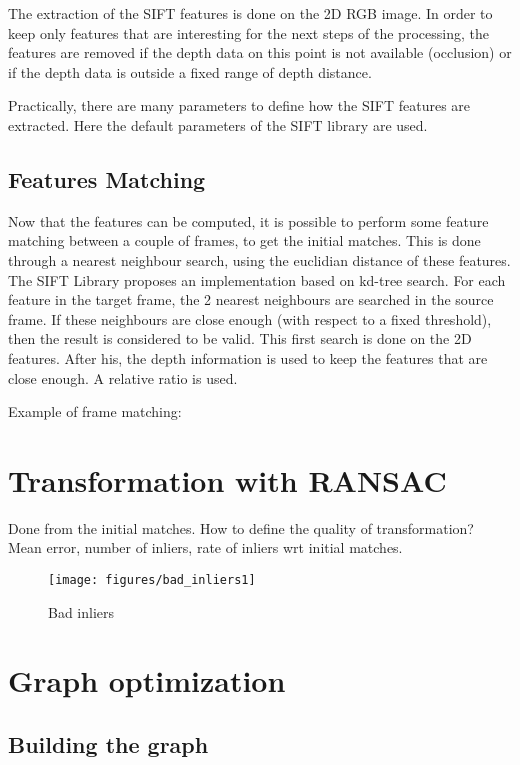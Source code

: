\documentclass[a4paper,11pt]{kth-mag}
\begin{document}
The extraction of the SIFT features is done on the 2D RGB image. In order to keep only features that are interesting for the next steps of the processing, the features are removed if the depth data on this point is not available (occlusion) or if the depth data is outside a fixed range of depth distance.

Practically, there are many parameters to define how the SIFT features are extracted. Here the default parameters of the SIFT library are used.

\subsection{Features Matching}

Now that the features can be computed, it is possible to perform some feature matching between a couple of frames, to get the initial matches. This is done through a nearest neighbour search, using the euclidian distance of these features.  
The SIFT Library proposes an implementation based on kd-tree search. For each feature in the target frame, the 2 nearest neighbours are searched in the source frame. If these neighbours are close enough (with respect to a fixed threshold), then the result is considered to be valid. This first search is done on the 2D features.
After his, the depth information is used to keep the features that are close enough. A relative ratio is used.

Example of frame matching: 

\section{Transformation with RANSAC}

Done from the initial matches.
How to define the quality of transformation? 
Mean error, number of inliers, rate of inliers wrt initial matches.

\begin{figure}[h]
\centering
\texttt{[image: figures/bad\_inliers1]}
\caption{Bad inliers}
\end{figure}

\section{Graph optimization}
\subsection{Building the graph}
\end{document}
